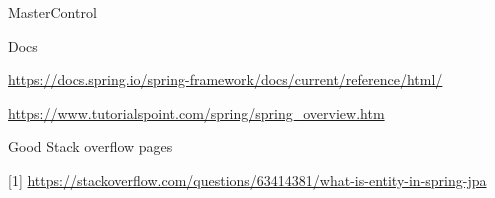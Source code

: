 \documentclass[presentation]{beamer}
\begin{document}
\begin{frame}[label={sec:org7867f2e}]{MasterControl}
\end{frame}

\begin{frame}[label={sec:org924ebd2}]{Docs}
\begin{block}{\url{https://docs.spring.io/spring-framework/docs/current/reference/html/}}
\end{block}
\begin{block}{\url{https://www.tutorialspoint.com/spring/spring\_overview.htm}}
\end{block}
\end{frame}
\begin{frame}[label={sec:orgc87e42f}]{Good Stack overflow pages}
\begin{block}{[1] \url{https://stackoverflow.com/questions/63414381/what-is-entity-in-spring-jpa}}
\end{block}
\end{frame}
\end{document}

